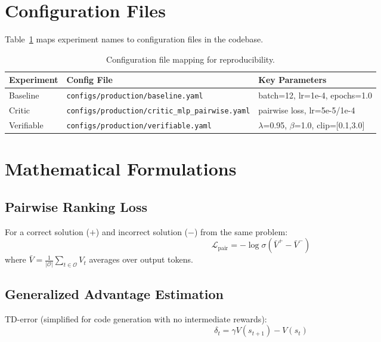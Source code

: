 \appendix

\section{Configuration Files}
\label{app:configs}

Table~\ref{tab:config_mapping} maps experiment names to configuration files in the codebase.

\begin{table}[h]
\centering
\caption{Configuration file mapping for reproducibility.}
\label{tab:config_mapping}
\begin{tabular}{lll}
\toprule
\textbf{Experiment} & \textbf{Config File} & \textbf{Key Parameters} \\
\midrule
Baseline & \texttt{configs/production/baseline.yaml} & batch=12, lr=1e-4, epochs=1.0 \\
Critic & \texttt{configs/production/critic\_mlp\_pairwise.yaml} & pairwise loss, lr=5e-5/1e-4 \\
Verifiable & \texttt{configs/production/verifiable.yaml} & $\lambda$=0.95, $\beta$=1.0, clip=[0.1,3.0] \\
\bottomrule
\end{tabular}
\end{table}

\section{Mathematical Formulations}
\label{app:math}

\subsection{Pairwise Ranking Loss}

For a correct solution ($+$) and incorrect solution ($-$) from the same problem:
\begin{equation}
    \mathcal{L}_{\text{pair}} = -\log \sigma(\bar{V}^{+} - \bar{V}^{-})
\end{equation}
where $\bar{V} = \frac{1}{|\mathcal{O}|} \sum_{t \in \mathcal{O}} V_t$ averages over output tokens.

\subsection{Generalized Advantage Estimation}

TD-error (simplified for code generation with no intermediate rewards):
\begin{equation}
    \delta_t = \gamma V(s_{t+1}) - V(s_t)
\end{equation}

